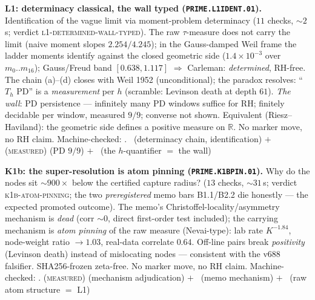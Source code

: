 \documentclass[11pt,a4paper]{article}
\theoremstyle{definition}
\begin{document}
\par\smallskip\noindent\textbf{L1: determinacy classical, the wall
typed (\texttt{PRIME.L1IDENT.01}).}
Identification of the vague limit via moment-problem determinacy
($11$ checks, ${\sim}2$\,s; verdict
\textsc{l1-determined-wall-typed}).  The raw $\tau$-measure does not
carry the limit (naive moment slopes $2.254/4.245$); in the
Gauss-damped Weil frame the ladder moments identify against the
closed geometric side ($1.4\times10^{-3}$ over $m_0..m_{16}$);
Gauss/Freud band $[0.638,1.117]$ $\Rightarrow$ Carleman:
\emph{determined}, RH-free.  The chain (a)--(d) closes with Weil
1952 (unconditional); the paradox resolves: ``$T_h$ PD'' is a
\emph{measurement} per $h$ (scramble: Levinson death at depth
$61$).  \emph{The wall}: PD persistence --- infinitely many PD
windows suffice for RH; finitely decidable per window, measured
$9/9$; converse not shown.  Equivalent (Riesz--Haviland): the
geometric side defines a positive measure on $\mathbb R$.  No
marker move, no RH claim.
Machine-checked: .
\mE\ (determinacy chain, identification) $+$ (\textsc{measured})
(PD $9/9$) $+$ \mO\ (the $h$-quantifier $=$ the wall)
\par\smallskip

\par\smallskip\noindent\textbf{K1b: the super-resolution is atom
pinning (\texttt{PRIME.K1BPIN.01}).}
Why do the nodes sit ${\sim}900\times$ below the certified capture
radius? ($13$ checks, ${\sim}31$\,s; verdict
\textsc{k1b-atom-pinning}; the two \emph{preregistered} memo bars
B1.1/B2.2 die honestly --- the expected promoted outcome).  The
memo's Christoffel-locality/asymmetry mechanism is \emph{dead}
(corr ${\sim}0$, direct first-order test included); the carrying
mechanism is \emph{atom pinning} of the raw measure (Nevai-type):
lab rate $K^{-1.84}$, node-weight ratio $\to1.03$, real-data
correlate $0.64$.  Off-line pairs break \emph{positivity} (Levinson
death) instead of mislocating nodes --- consistent with the v688
falsifier.  SHA256-frozen zeta-free.  No marker move, no RH claim.
Machine-checked: .
(\textsc{measured}) (mechanism adjudication) $+$ \mX\ (memo
mechanism) $+$ \mO\ (raw atom structure $=$ L1)
\par\smallskip
\end{document}
